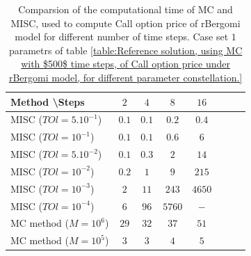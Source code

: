 \documentclass[11pt]{article}
\begin{document}
\begin{table}[h!]
	\centering
	\begin{tabular}{l*{6}{c}r}
		Method \textbackslash  Steps            & $2$ & $4$ & $8$ & $16$ &   \\
		\hline
		MISC ($TOl=5.10^{-1}$)  & $0.1$ & $0.1$ & $0.2$ & $0.4$  \\
		MISC ($TOl=10^{-1}$)  & $0.1$ & $0.1$ & $0.6$ & $6$  \\
		MISC ($TOl=5.10^{-2}$)  & $0.1$ & $0.3$ & $2$ & $14$  \\
		MISC ($TOl=10^{-2}$)  & $0.2$ & $1$ & $9$ & $215$  \\
		MISC ($TOl=10^{-3}$)  & $2$ & $11$ & $243$ & $4650$  \\
		MISC ($TOl=10^{-4}$)  & $6$ & $96$ & $5760$ & $-$  \\
		\hline
		MC method ($M=10^6$)   & $29$  & $32$  & $37$ & $51$  \\
		MC method ($M=10^5$)   & $3$  & $3$  & $4$ & $5$  \\
		\hline
	\end{tabular}
	\caption{Comparsion of the computational time of  MC and MISC, used to compute Call option price of rBergomi model for different number of time steps. Case set $1$ parametrs of table \ref{table:Reference solution, using MC with $500$ time steps, of Call option price under rBergomi model, for different parameter constellation.} }
	\label{Comparsion of the computational time of  MC and MISC, used to compute Call option price of rBergomi model for different number of time steps. Case set1}
\end{table}
\end{document}
